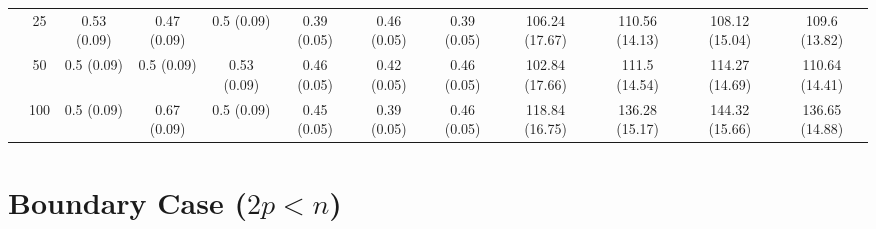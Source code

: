 \documentclass[11pt]{article}
\theoremstyle{definition}
\begin{document}
\begin{table}[H]
\begin{center}
{\begin{tabular}{cc|ccc|ccc|cccc|}
    & 25  & 0.53 (0.09) & 0.47 (0.09) & 0.5 (0.09) & 0.39 (0.05) & 0.46 (0.05) & 0.39 (0.05) & 106.24 (17.67) & 110.56 (14.13) & 108.12 (15.04) & 109.6 (13.82) \\ 
    & 50  & 0.5 (0.09) & 0.5 (0.09) & 0.53 (0.09) & 0.46 (0.05) & 0.42 (0.05) & 0.46 (0.05) & 102.84 (17.66) & 111.5 (14.54) & 114.27 (14.69) & 110.64 (14.41) \\ 
    & 100  & 0.5 (0.09) & 0.67 (0.09) & 0.5 (0.09) & 0.45 (0.05) & 0.39 (0.05) & 0.46 (0.05) & 118.84 (16.75) & 136.28 (15.17) & 144.32 (15.66) & 136.65 (14.88) \\
\end{tabular}}
   \end{center}
      \vspace{-.5cm}
\end{table}


\section{Boundary Case ($2p < n$)}

\label{boundary}
\end{document}

